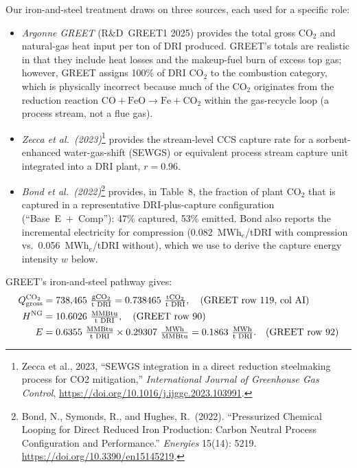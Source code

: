 \documentclass[11pt]{article}
\newcommand{\cotwo}{\ensuremath{\mathrm{CO_2}}}
\begin{document}
Our iron-and-steel treatment draws on three sources, each used for a specific role:
%
\begin{itemize}
  \item \emph{Argonne GREET} (R\&D~GREET1 2025) provides the total gross \cotwo{} and natural-gas heat input per ton of DRI produced. GREET's totals are realistic in that they include heat losses and the makeup-fuel burn of excess top gas; however, GREET assigns 100\% of DRI \cotwo{} to the combustion category, which is physically incorrect because much of the \cotwo{} originates from the reduction reaction $\text{CO} + \text{FeO} \to \text{Fe} + \text{CO}_2$ within the gas-recycle loop (a process stream, not a flue gas).
  \item \emph{Zecca et al.\ (2023)}\footnote{Zecca et al., 2023, ``SEWGS integration in a direct reduction steelmaking process for CO2 mitigation,'' \emph{International Journal of Greenhouse Gas Control}, \url{https://doi.org/10.1016/j.ijggc.2023.103991}.} provides the stream-level CCS capture rate for a sorbent-enhanced water-gas-shift (SEWGS) or equivalent process stream capture unit integrated into a DRI plant, $r = 0.96$.
  \item \emph{Bond et al.\ (2022)}\footnote{Bond, N., Symonds, R., and Hughes, R.\ (2022). ``Pressurized Chemical Looping for Direct Reduced Iron Production: Carbon Neutral Process Configuration and Performance.'' \emph{Energies} 15(14): 5219. \url{https://doi.org/10.3390/en15145219}.} provides, in Table~8, the fraction of plant \cotwo{} that is captured in a representative DRI-plus-capture configuration (``Base~E~+~Comp''): 47\% captured, 53\% emitted. Bond also reports the incremental electricity for compression (0.082~MWh$_e$/tDRI with compression vs.\ 0.056~MWh$_e$/tDRI without), which we use to derive the capture energy intensity $w$ below.
\end{itemize}

GREET's iron-and-steel pathway gives:
%
\begin{align*}
  Q_{\text{gross}}^{\cotwo{}} &= 738{,}465~\tfrac{\text{g\cotwo{}}}{\text{t DRI}} = 0.738465~\tfrac{\text{t\cotwo{}}}{\text{t DRI}}, \quad \text{(GREET row 119, col AI)} \\
  H^{\text{NG}} &= 10.6026~\tfrac{\text{MMBtu}}{\text{t DRI}}, \quad \text{(GREET row 90)} \\
  E &= 0.6355~\tfrac{\text{MMBtu}}{\text{t DRI}} \times 0.29307~\tfrac{\text{MWh}}{\text{MMBtu}} = 0.1863~\tfrac{\text{MWh}}{\text{t DRI}}. \quad \text{(GREET row 92)}
\end{align*}
\end{document}
